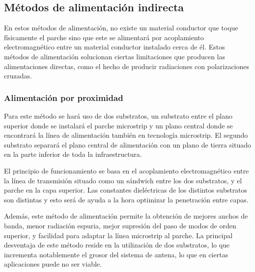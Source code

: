 \subsection{Métodos de alimentación indirecta}
\par En estos métodos de alimentación, no existe un material conductor que toque físicamente el parche sino que este se alimentará por acoplamiento electromagnético entre un material conductor instalado cerca de él. Estos métodos de alimentación solucionan ciertas limitaciones que producen las alimentaciones directas, como el hecho de producir radiaciones con polarizaciones cruzadas.

\subsubsection{Alimentación por proximidad}
\par Para este método se hará uso de dos substratos, un substrato entre el plano superior donde se instalará el parche microstrip y un plano central donde se encontrará la línea de alimentación también en tecnología microstrip. El segundo substrato separará el plano central de alimentación con un plano de tierra situado en la parte inferior de toda la infraestructura. 
\\
\par El principio de funcionamiento se basa en el acoplamiento electromagnético entre la línea de transmisión situado como un sándwich entre los dos substratos, y el parche en la capa superior.  Las constantes dieléctricas de los distintos substratos son distintas y esto será de ayuda a la hora optimizar la penetración entre capas.
\\
\par Además, este método de alimentación permite la obtención de mejores anchos de banda, menor radiación espuria, mejor supresión del paso de modos de orden superior, y facilidad para adaptar la línea microstrip al parche. La principal desventaja de este método reside en la utilización de dos substratos, lo que incrementa notablemente el grosor del sistema de antena, lo que en ciertas aplicaciones puede no ser viable.


